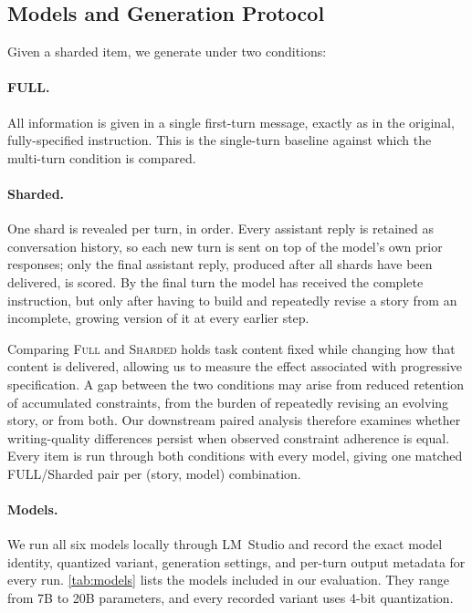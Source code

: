 \subsection{Models and Generation Protocol}
\label{sec:models}

Given a sharded item, we generate under two conditions:

\paragraph{FULL.} All information is given in a single first-turn message, exactly as in the original, fully-specified instruction. This is the single-turn baseline against which the multi-turn condition is compared.
\paragraph{Sharded.} One shard is revealed per turn, in order. Every assistant reply is retained as conversation history, so each new turn is sent on top of the model's own prior responses; only the final assistant reply, produced after all shards have been delivered, is scored. By the final turn the model has received the complete instruction, but only after having to build and repeatedly revise a story from an incomplete, growing version of it at every earlier step.

Comparing \textsc{Full} and \textsc{Sharded} holds task content fixed while changing how that content is delivered, allowing us to measure the effect associated with progressive specification. A gap between the two conditions may arise from reduced retention of accumulated constraints, from the burden of repeatedly revising an evolving story, or from both. Our downstream paired analysis therefore examines whether writing-quality differences persist when observed constraint adherence is equal. Every item is run through both conditions with every model, giving one matched FULL/Sharded pair per (story, model) combination.

\paragraph{Models.} We run all six models locally through LM~Studio and record the exact model identity, quantized variant, generation settings, and per-turn output metadata for every run. \cref{tab:models} lists the models included in our evaluation. They range from 7B to 20B parameters, and every recorded variant uses 4-bit quantization.

